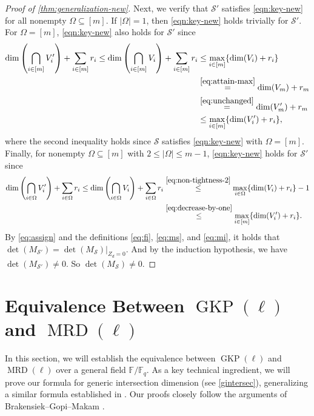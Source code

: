 \documentclass[11pt]{article}
\newif\ifmynotes
\newcommand{\ZGnote}[1]{\ifmynotes\textcolor{purple}{[Zeyu: #1]}\else\fi}
\theoremstyle{plain}
\theoremstyle{definition}
\theoremstyle{remark}
\newcommand{\F}{\mathbb{F}}
\newcommand{\cS}{\mathcal{S}}
\begin{document}
\begin{proof}[Proof of \cref{thm:generalization-new}]
Next, we verify that $\cS'$ satisfies \eqref{eqn:key-new} for all nonempty $\Omega\subseteq [m]$.
If $|\Omega|=1$, then \eqref{eqn:key-new} holds trivially for $\cS'$.
For $\Omega=[m]$, \eqref{eqn:key-new} also holds for $\cS'$ since
\begin{align*}
\dim\left(\bigcap_{i\in [m]} V'_i\right)+\sum_{i\in[m]} r_i
\leq \dim\left(\bigcap_{i\in [m]} V_i\right)+\sum_{i\in[m]} r_i&\leq \max_{i\in [m]}\{\dim (V_i)+r_i\}\\
&\stackrel{\eqref{eq:attain-max}}{=}\dim (V_m)+r_m\\
&\stackrel{\eqref{eq:unchanged}}{=}\dim(V_m')+r_m\\
&\leq \max_{i\in [m]}\{\dim (V_i')+r_i\},
\end{align*}
where the second inequality holds since $\cS$ satisfies \eqref{eqn:key-new} with $\Omega=[m]$.
Finally, for nonempty $\Omega\subseteq [m]$ with $2\leq |\Omega|\leq m-1$, \eqref{eqn:key-new} holds for $\cS'$ since
\begin{align*}
\dim\left(\bigcap_{i\in \Omega} V'_i\right)+\sum_{i\in\Omega} r_i
\leq \dim\left(\bigcap_{i\in \Omega} V_i\right)+\sum_{i\in\Omega} r_i
&\stackrel{\eqref{eq:non-tightness-2}}{\leq} \max_{i\in \Omega}\{\dim (V_i)+r_i\}-1\\
&\stackrel{\eqref{eq:decrease-by-one}}{\leq} \max_{i\in [m]}\{\dim (V_i')+r_i\}.
\end{align*}
By \eqref{eq:assign} and the definitions \eqref{eq:fi}, \eqref{eq:ms}, and \eqref{eq:mi}, it holds that $\det(M_{\cS'})=\det(M_{\cS})|_{Z_d=0}$.
And by the induction hypothesis, we have $\det(M_{\cS'})\neq 0$.
So $\det(M_{\cS})\neq 0$.
\end{proof}

%

\section{Equivalence Between $\operatorname{GKP}(\ell)$ and $\operatorname{MRD}(\ell)$}\label{ss5}

In this section, we will establish the equivalence between $\operatorname{GKP}(\ell)$ and $\operatorname{MRD}(\ell)$ over a general field $\F/\F_q$. As a key technical ingredient, we will prove our formula for generic intersection dimension (see \cref{gintersec}), %
generalizing a similar formula established in \cite{brakensiek2023generic}. Our proofs closely follow the arguments of Brakensiek--Gopi--Makam \cite{brakensiek2023generic}.
\end{document}
